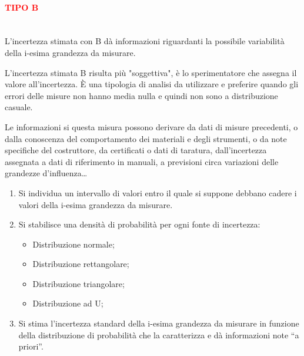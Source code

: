 \documentclass[a4paper, 15pt]{article}
\begin{document}
\begin{adjustwidth}{2in}{}
	\paragraph{\Large \textcolor{red}{\textbf{TIPO B}}} \mbox{} \\ 
	L’incertezza stimata con B dà informazioni riguardanti la possibile variabilità della i-esima
	grandezza da misurare.
	
	L'incertezza stimata B risulta più "soggettiva", è lo sperimentatore che assegna il valore all'incertezza. È una tipologia di analisi da utilizzare e preferire quando gli errori delle misure non hanno media nulla e quindi non sono a distribuzione casuale. 
	
	Le informazioni si questa misura possono derivare da dati di misure precedenti, o dalla conoscenza del comportamento dei materiali e degli strumenti, o da note specifiche del costruttore, da certificati o dati di taratura, dall'incertezza assegnata a dati di riferimento in manuali, a previsioni circa variazioni delle grandezze d'influenza\dots 	
	\begin{enumerate}
		\item Si individua un intervallo di valori entro il quale si suppone debbano cadere i valori della i-esima grandezza da misurare.
		\item Si stabilisce una densità di probabilità per ogni fonte di incertezza:
		\begin{itemize}
			\item Distribuzione normale;
			\item Distribuzione rettangolare;
			\item Distribuzione triangolare;
			\item Distribuzione ad U;
		\end{itemize}
		\item Si stima l’incertezza standard della i-esima grandezza da misurare in funzione
		della distribuzione di probabilità che la caratterizza e dà informazioni note “a
		priori”.
	\end{enumerate}
\end{adjustwidth}
\end{document}
